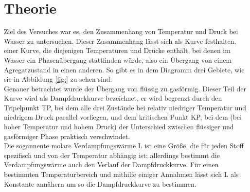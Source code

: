\section{Theorie}
\label{sec:Theorie}
Ziel des Versuches war es, den Zusammenhang von Temperatur und Druck bei Wasser 
zu untersuchen. Dieser Zusammenhang lässt sich als Kurve festhalten,
einer Kurve, die diejenigen Temperaturen und Drücke enthält, bei denen im Wasser
ein Phasenübergang stattfinden würde, also ein Übergang von einem Agregatzustand
in einen anderen. So gibt es in dem Diagramm drei Gebiete, wie sie in Abbildung \ref{fig:}
zu sehen sind. \\
Genauer betrachtet wurde der Übergang von flüssig zu gasförmig. Dieser Teil der Kurve wird als
Dampfdruckkurve bezeichnet, er wird begrenzt durch den Tripelpunkt TP, bei dem alle drei Zustände
bei relativ niedriger Temperatur und niedrigem Druck parallel vorliegen, und dem kritischen
Punkt KP, bei dem (bei hoher Temperatur und hohem Druck) der Unterschied zwischen flüssiger und
gasförmiger Phase praktisch verschwindet.\\
Die sogannente molare Verdampfungswärme L ist eine Größe, die für jeden Stoff spezifisch und von der 
Temperatur abhängig ist; allerdings bestimmt die Verdampfungswärme auch den Verlauf der 
Dampfdruckkurve. Für einen bestimmten Temperaturbereich und mithilfe einiger Annahmen lässt sich
L als Konstante annähern um so die Dampfdruckkurve zu bestimmen. \\

